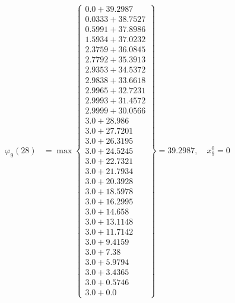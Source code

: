 \documentclass{article}
\begin{document}
\begin{align*}
  
\varphi_{9}(28) &= \max \left\{ \begin{array}{c}
0.0 + 39.2987 \\
 0.0333 + 38.7527 \\
 0.5991 + 37.8986 \\
 1.5934 + 37.0232 \\
 2.3759 + 36.0845 \\
 2.7792 + 35.3913 \\
 2.9353 + 34.5372 \\
 2.9838 + 33.6618 \\
 2.9965 + 32.7231 \\
 2.9993 + 31.4572 \\
 2.9999 + 30.0566 \\
 3.0 + 28.986 \\
 3.0 + 27.7201 \\
 3.0 + 26.3195 \\
 3.0 + 24.5245 \\
 3.0 + 22.7321 \\
 3.0 + 21.7934 \\
 3.0 + 20.3928 \\
 3.0 + 18.5978 \\
 3.0 + 16.2995 \\
 3.0 + 14.658 \\
 3.0 + 13.1148 \\
 3.0 + 11.7142 \\
 3.0 + 9.4159 \\
 3.0 + 7.38 \\
 3.0 + 5.9794 \\
 3.0 + 3.4365 \\
 3.0 + 0.5746 \\
 3.0 + 0.0
\end{array} \right\}=39.2987,\quad x_{9}^0=0\\
  
  
  

\end{align*}
\end{document}
